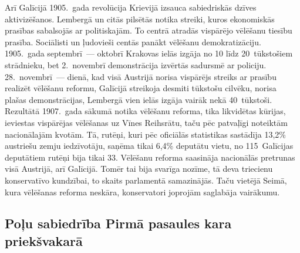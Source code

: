\documentclass[twoside,a5paper,12pt,fleqn,openany]{extbook}
\begin{document}
Arī Galīcijā 1905.~gada revolūcija Krievijā izsauca sabiedriskās dzīves aktivizēšanos. Lembergā un citās pilsētās notika streiki, kuros ekonomiskās prasības sabalsojās ar politiskajām. To centrā atradās vispārējo vēlēšanu tiesību prasība. Sociālisti un ļudovieši centās panākt vēlēšanu demokratizāciju. 1905.~gada septembrī~--- oktobrī Krakovas ielās izgāja no 10 līdz 20~tūkstošiem strādnieku, bet 2.~novembrī demonstrācija izvērtās sadursmē ar policiju. 28.~novembrī~--- dienā, kad visā Austrijā norisa vispārējs streiks ar prasību realizēt vēlēšanu reformu, Galīcijā streikoja desmiti tūkstošu cilvēku, norisa plašas demonstrācijas, Lembergā vien ielās izgāja vairāk nekā 40~tūkstoši. Rezultātā 1907.~gada sākumā notika vēlēšanu reforma, tika likvidētas kūrijas, ieviestas vispārējas vēlēšanas uz Vīnes Reihsrātu, taču pēc patvaļīgi noteiktām nacionālajām kvotām. Tā, rutēņi, kuri pēc oficiālās statistikas sastādīja 13,2\% austriešu zemju iedzīvotāju, saņēma tikai 6,4\% deputātu vietu, no 115~Galīcijas deputātiem rutēņi bija tikai 33. Vēlēšanu reforma saasināja nacionālās pretrunas visā Austrijā, arī Galīcijā. Tomēr tai bija svarīga nozīme, tā deva triecienu konservatīvo kundzībai, to skaits parlamentā samazinājās. Taču vietējā Seimā, kura vēlēšanas reforma neskāra, konservatori joprojām saglabāja vairākumu.

\subsection{Poļu sabiedrība Pirmā pasaules kara priekšvakarā}

\end{document}
